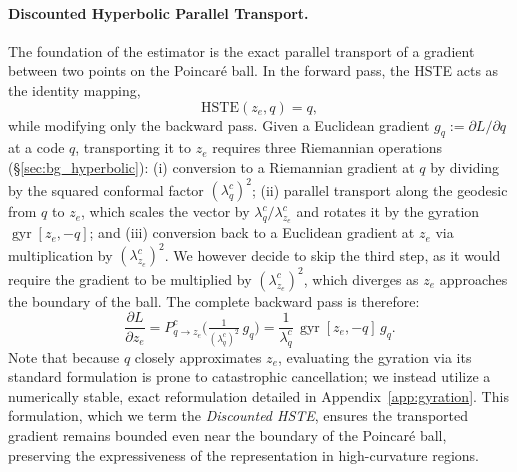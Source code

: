 \documentclass[12pt]{report}
\begin{document}
\paragraph{Discounted Hyperbolic Parallel Transport.}
The foundation of the estimator is the exact parallel transport of a gradient between two points on the Poincar\'e ball. In the forward pass, the HSTE acts as the identity mapping,
\begin{equation}
    \label{eq:hste_forward}
    \mathrm{HSTE}(z_e,q) = q,
\end{equation}
while modifying only the backward pass. Given a Euclidean gradient $g_q := \partial L/\partial q$ at a code $q$, transporting it to $z_e$ requires three Riemannian operations (\S\ref{sec:bg_hyperbolic}): (i) conversion to a Riemannian gradient at $q$ by dividing by the squared conformal factor $(\lambda^c_q)^2$; (ii) parallel transport along the geodesic from $q$ to $z_e$, which scales the vector by $\lambda^c_q/\lambda^c_{z_e}$ and rotates it by the gyration $\operatorname{gyr}[z_e,-q]$; and (iii) conversion back to a Euclidean gradient at $z_e$ via multiplication by $(\lambda^c_{z_e})^2$. We however decide to skip the third step, as it would require the gradient to be multiplied by $(\lambda^c_{z_e})^2$, which diverges as $z_e$ approaches the boundary of the ball. The complete backward pass is therefore:
\begin{equation}
    \label{eq:hste_backward}
    \frac{\partial L}{\partial z_e}
    = P^c_{q\to z_e}\!\Big(\tfrac{1}{(\lambda^c_q)^2}\,g_q\Big)
    = \frac{1}{\lambda^c_q}\,\operatorname{gyr}[z_e,-q]\,g_q .
\end{equation}
Note that because $q$ closely approximates $z_e$, evaluating the gyration via its standard formulation is prone to catastrophic cancellation; we instead utilize a numerically stable, exact reformulation detailed in Appendix~\ref{app:gyration}. This formulation, which we term the \emph{Discounted HSTE}, ensures the transported gradient remains bounded even near the boundary of the Poincar\'e ball, preserving the expressiveness of the representation in high-curvature regions.
\end{document}
